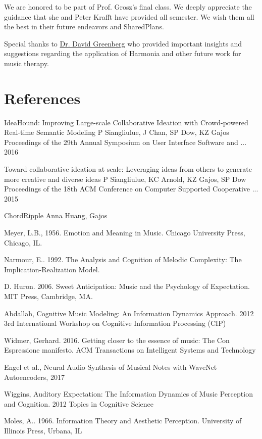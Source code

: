 \documentclass[final,authoryear,5p,times,twocolumn]{elsarticle}
\begin{document}
We are honored to be part of Prof. Grosz's final class. We deeply appreciate the guidance that she and Peter Krafft have provided all semester. We wish them all the best in their future endeavors and SharedPlans.

Special thanks to \href{https://www.psychologytoday.com/experts/david-m-greenberg-phd}{Dr. David Greenberg} who provided important insights and suggestions regarding the application of Harmonia and other future work for music therapy.

\section*{References}

 
IdeaHound: Improving Large-scale Collaborative Ideation with Crowd-powered Real-time Semantic Modeling
P Siangliulue, J Chan, SP Dow, KZ Gajos
Proceedings of the 29th Annual Symposium on User Interface Software and ...
2016

Toward collaborative ideation at scale: Leveraging ideas from others to generate more creative and diverse ideas
P Siangliulue, KC Arnold, KZ Gajos, SP Dow
Proceedings of the 18th ACM Conference on Computer Supported Cooperative ...
2015

ChordRipple Anna Huang, Gajos

Meyer, L.B., 1956. Emotion and Meaning in Music. Chicago University Press, Chicago, IL.

Narmour, E.. 1992. The Analysis and Cognition of Melodic Complexity: The Implication-Realization Model.

D. Huron. 2006. Sweet Anticipation: Music and the Psychology of Expectation. MIT Press, Cambridge, MA.

Abdallah, Cognitive Music Modeling: An Information Dynamics Approach. 2012 3rd International Workshop on Cognitive Information Processing (CIP)

Widmer, Gerhard. 2016. Getting closer to the essence of music: The Con Espressione manifesto. ACM Transactions on Intelligent Systems and Technology

Engel et al., Neural Audio Synthesis of Musical Notes with WaveNet Autoencoders, 2017

Wiggins, Auditory Expectation: The Information Dynamics of Music Perception and Cognition. 2012 Topics in Cognitive Science

Moles, A.. 1966. Information Theory and Aesthetic Perception. University of Illinois Press, Urbana, IL
\end{document}
